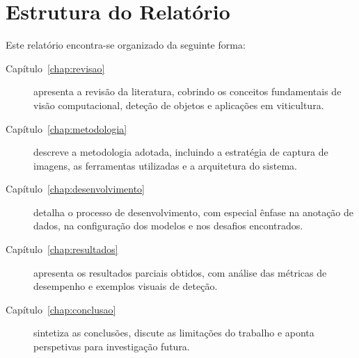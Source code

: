 \section{Estrutura do Relatório}

Este relatório encontra-se organizado da seguinte forma:

\begin{description}
  \item[Capítulo~\ref{chap:revisao}] apresenta a revisão da literatura,
    cobrindo os conceitos fundamentais de visão computacional, deteção de
    objetos e aplicações em viticultura.

  \item[Capítulo~\ref{chap:metodologia}] descreve a metodologia adotada,
    incluindo a estratégia de captura de imagens, as ferramentas utilizadas
    e a arquitetura do sistema.

  \item[Capítulo~\ref{chap:desenvolvimento}] detalha o processo de
    desenvolvimento, com especial ênfase na anotação de dados, na
    configuração dos modelos e nos desafios encontrados.

  \item[Capítulo~\ref{chap:resultados}] apresenta os resultados parciais
    obtidos, com análise das métricas de desempenho e exemplos visuais de
    deteção.

  \item[Capítulo~\ref{chap:conclusao}] sintetiza as conclusões, discute as
    limitações do trabalho e aponta perspetivas para investigação futura.
\end{description}
